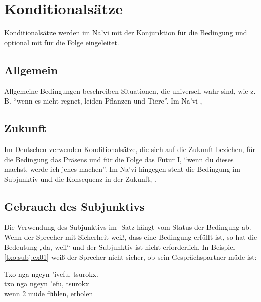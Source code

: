 \section{Konditionalsätze}
\noindent Konditionalsätze werden im Na'vi mit der Konjunktion   für die Bedingung und optional mit   für die Folge eingeleitet.
\label{syn:conditionals}

\subsection{Allgemein} Allgemeine Bedingungen beschreiben Situationen, die universell wahr sind, wie z. B. ``wenn es nicht regnet, leiden Pflanzen und Tiere''. Im Na'vi ,  

\subsection{Zukunft} Im Deutschen verwenden Konditionalsätze, die sich auf die Zukunft beziehen, für die Bedingung das Präsens und für die Folge das Futur I, ``wenn du dieses machst, werde ich jenes machen''. Im Na'vi hingegen steht die Bedingung im Subjunktiv und die Konsequenz in der Zukunft,  . 

\subsection{Gebrauch des Subjunktivs} 
Die Verwendung des Subjunktivs im -Satz hängt vom Status der Bedingung ab. Wenn der Sprecher mit Sicherheit weiß, dass eine Bedingung erfüllt ist, so hat  die Bedeutung „da, weil“ und der Subjunktiv ist nicht erforderlich. In Beispiel \ref{txo:subj:ex01} weiß der Sprecher nicht sicher, ob sein Gesprächspartner müde ist:

\begin{interlin} \label{txo:subj:ex01}
	\glll Txo nga ngeyn 'ivefu, tsurokx. \\
	txo nga ngeyn 'efu, tsurokx \\ 
	wenn 2 müde fühlen, erholen \\
\end{interlin}

